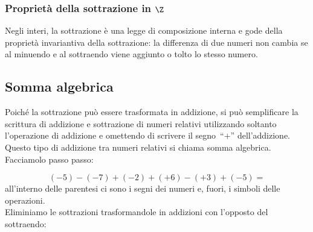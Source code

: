 \vspace{1em}

\subsubsection{Proprietà della sottrazione in \(\Z\)}

Negli interi, la sottrazione è una legge di composizione interna e gode della 
proprietà invariantiva della sottrazione:
la differenza di due numeri non cambia se al minuendo e al sottraendo viene 
aggiunto o tolto lo stesso numero.

\subsection{Somma algebrica}

Poiché la sottrazione può essere trasformata in addizione, si può 
semplificare la scrittura di addizione e sottrazione di numeri relativi 
utilizzando soltanto l'operazione di addizione e omettendo di scrivere
il segno~``\(+\)'' dell'addizione. 
Questo tipo di addizione tra numeri relativi si chiama somma algebrica.
Facciamolo passo passo:

\vspace{-1em}
\[(-5)-(-7)+(-2)+(+6)-(+3)+(-5) =\]
all'interno delle parentesi ci sono i segni dei numeri e, fuori, i simboli 
delle operazioni.\\
Eliminiamo le sottrazioni trasformandole in addizioni 
con l'opposto del sottraendo:

